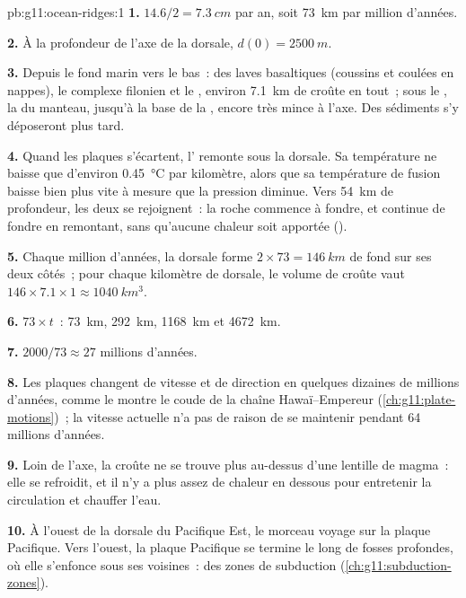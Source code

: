 \begin{solution}{pb:g11:ocean-ridges:1}
\textbf{1.} $14.6/2 = \qty{7.3}{cm}$ par an, soit \qty{73}{km} par million
d'années.

\textbf{2.} À la profondeur de l'axe de la dorsale, $d(0) = \qty{2500}{m}$.

\textbf{3.} Depuis le fond marin vers le bas~: des laves basaltiques
(coussins et coulées en nappes), le complexe filonien et le , environ
\qty{7.1}{km} de croûte en tout~; sous le , la  du manteau,
jusqu'à la base de la , encore très mince à l'axe. Des sédiments
s'y déposeront plus tard.

\textbf{4.} Quand les plaques s'écartent, l' remonte sous la
dorsale. Sa température ne baisse que d'environ \qty{0.45}{\celsius} par
kilomètre, alors que sa température de fusion baisse bien plus vite à mesure
que la pression diminue. Vers \qty{54}{km} de profondeur, les deux se
rejoignent~: la roche commence à fondre, et continue de fondre en
remontant, sans qu'aucune chaleur soit apportée ().

\textbf{5.} Chaque million d'années, la dorsale forme $2 \times 73 = \qty{146}{km}$
de fond sur ses deux côtés~; pour chaque kilomètre de dorsale, le volume de
croûte vaut $146 \times 7.1 \times 1 \approx \qty{1040}{km^3}$.

\textbf{6.} $73 \times t$~: \qty{73}{km}, \qty{292}{km}, \qty{1168}{km} et
\qty{4672}{km}.

\textbf{7.} $2000/73 \approx 27$ millions d'années.

\textbf{8.} Les plaques changent de vitesse et de direction en quelques
dizaines de millions d'années, comme le montre le coude de la chaîne
Hawaï--Empereur (\cref{ch:g11:plate-motions})~; la vitesse actuelle n'a pas
de raison de se maintenir pendant 64 millions d'années.

\textbf{9.} Loin de l'axe, la croûte ne se trouve plus au-dessus d'une
lentille de magma~: elle se refroidit, et il n'y a plus assez de chaleur
en dessous pour entretenir la circulation et chauffer l'eau.

\textbf{10.} À l'ouest de la dorsale du Pacifique Est, le morceau voyage sur
la plaque Pacifique. Vers l'ouest, la plaque Pacifique se termine le long de
fosses profondes, où elle s'enfonce sous ses voisines~: des zones de
subduction (\cref{ch:g11:subduction-zones}).


\end{solution}
